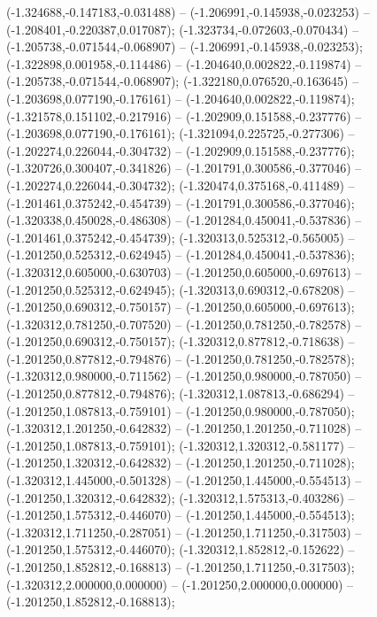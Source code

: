  (-1.324688,-0.147183,-0.031488) -- (-1.206991,-0.145938,-0.023253) -- (-1.208401,-0.220387,0.017087);
 (-1.323734,-0.072603,-0.070434) -- (-1.205738,-0.071544,-0.068907) -- (-1.206991,-0.145938,-0.023253);
 (-1.322898,0.001958,-0.114486) -- (-1.204640,0.002822,-0.119874) -- (-1.205738,-0.071544,-0.068907);
 (-1.322180,0.076520,-0.163645) -- (-1.203698,0.077190,-0.176161) -- (-1.204640,0.002822,-0.119874);
 (-1.321578,0.151102,-0.217916) -- (-1.202909,0.151588,-0.237776) -- (-1.203698,0.077190,-0.176161);
 (-1.321094,0.225725,-0.277306) -- (-1.202274,0.226044,-0.304732) -- (-1.202909,0.151588,-0.237776);
 (-1.320726,0.300407,-0.341826) -- (-1.201791,0.300586,-0.377046) -- (-1.202274,0.226044,-0.304732);
 (-1.320474,0.375168,-0.411489) -- (-1.201461,0.375242,-0.454739) -- (-1.201791,0.300586,-0.377046);
 (-1.320338,0.450028,-0.486308) -- (-1.201284,0.450041,-0.537836) -- (-1.201461,0.375242,-0.454739);
 (-1.320313,0.525312,-0.565005) -- (-1.201250,0.525312,-0.624945) -- (-1.201284,0.450041,-0.537836);
 (-1.320312,0.605000,-0.630703) -- (-1.201250,0.605000,-0.697613) -- (-1.201250,0.525312,-0.624945);
 (-1.320313,0.690312,-0.678208) -- (-1.201250,0.690312,-0.750157) -- (-1.201250,0.605000,-0.697613);
 (-1.320312,0.781250,-0.707520) -- (-1.201250,0.781250,-0.782578) -- (-1.201250,0.690312,-0.750157);
 (-1.320312,0.877812,-0.718638) -- (-1.201250,0.877812,-0.794876) -- (-1.201250,0.781250,-0.782578);
 (-1.320312,0.980000,-0.711562) -- (-1.201250,0.980000,-0.787050) -- (-1.201250,0.877812,-0.794876);
 (-1.320312,1.087813,-0.686294) -- (-1.201250,1.087813,-0.759101) -- (-1.201250,0.980000,-0.787050);
 (-1.320312,1.201250,-0.642832) -- (-1.201250,1.201250,-0.711028) -- (-1.201250,1.087813,-0.759101);
 (-1.320312,1.320312,-0.581177) -- (-1.201250,1.320312,-0.642832) -- (-1.201250,1.201250,-0.711028);
 (-1.320312,1.445000,-0.501328) -- (-1.201250,1.445000,-0.554513) -- (-1.201250,1.320312,-0.642832);
 (-1.320312,1.575313,-0.403286) -- (-1.201250,1.575312,-0.446070) -- (-1.201250,1.445000,-0.554513);
 (-1.320312,1.711250,-0.287051) -- (-1.201250,1.711250,-0.317503) -- (-1.201250,1.575312,-0.446070);
 (-1.320312,1.852812,-0.152622) -- (-1.201250,1.852812,-0.168813) -- (-1.201250,1.711250,-0.317503);
 (-1.320312,2.000000,0.000000) -- (-1.201250,2.000000,0.000000) -- (-1.201250,1.852812,-0.168813);
